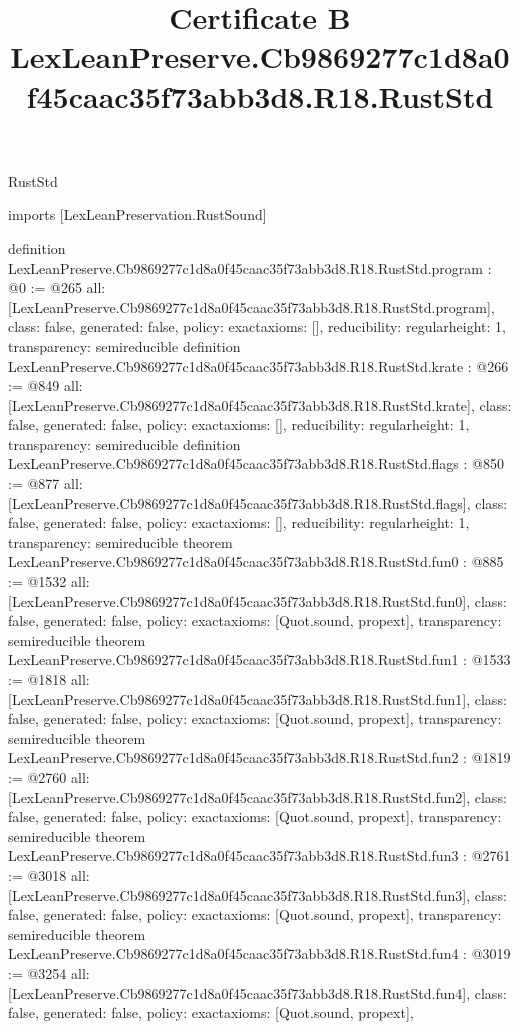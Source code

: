 \begin{lexlean}{RustStd}
\title{Certificate B LexLeanPreserve.Cb9869277c1d8a0f45caac35f73abb3d8.R18.RustStd}
\begin{coremodule}
imports [LexLeanPreservation.RustSound]

definition LexLeanPreserve.Cb9869277c1d8a0f45caac35f73abb3d8.R18.RustStd.program : @0 := @265 {
  all: [LexLeanPreserve.Cb9869277c1d8a0f45caac35f73abb3d8.R18.RustStd.program],
  class: false,
  generated: false,
  policy: exact{axioms: []},
  reducibility: regular{height: 1},
  transparency: semireducible
}
definition LexLeanPreserve.Cb9869277c1d8a0f45caac35f73abb3d8.R18.RustStd.krate : @266 := @849 {
  all: [LexLeanPreserve.Cb9869277c1d8a0f45caac35f73abb3d8.R18.RustStd.krate],
  class: false,
  generated: false,
  policy: exact{axioms: []},
  reducibility: regular{height: 1},
  transparency: semireducible
}
definition LexLeanPreserve.Cb9869277c1d8a0f45caac35f73abb3d8.R18.RustStd.flags : @850 := @877 {
  all: [LexLeanPreserve.Cb9869277c1d8a0f45caac35f73abb3d8.R18.RustStd.flags],
  class: false,
  generated: false,
  policy: exact{axioms: []},
  reducibility: regular{height: 1},
  transparency: semireducible
}
theorem LexLeanPreserve.Cb9869277c1d8a0f45caac35f73abb3d8.R18.RustStd.fun0 : @885 := @1532 {
  all: [LexLeanPreserve.Cb9869277c1d8a0f45caac35f73abb3d8.R18.RustStd.fun0],
  class: false,
  generated: false,
  policy: exact{axioms: [Quot.sound, propext]},
  transparency: semireducible
}
theorem LexLeanPreserve.Cb9869277c1d8a0f45caac35f73abb3d8.R18.RustStd.fun1 : @1533 := @1818 {
  all: [LexLeanPreserve.Cb9869277c1d8a0f45caac35f73abb3d8.R18.RustStd.fun1],
  class: false,
  generated: false,
  policy: exact{axioms: [Quot.sound, propext]},
  transparency: semireducible
}
theorem LexLeanPreserve.Cb9869277c1d8a0f45caac35f73abb3d8.R18.RustStd.fun2 : @1819 := @2760 {
  all: [LexLeanPreserve.Cb9869277c1d8a0f45caac35f73abb3d8.R18.RustStd.fun2],
  class: false,
  generated: false,
  policy: exact{axioms: [Quot.sound, propext]},
  transparency: semireducible
}
theorem LexLeanPreserve.Cb9869277c1d8a0f45caac35f73abb3d8.R18.RustStd.fun3 : @2761 := @3018 {
  all: [LexLeanPreserve.Cb9869277c1d8a0f45caac35f73abb3d8.R18.RustStd.fun3],
  class: false,
  generated: false,
  policy: exact{axioms: [Quot.sound, propext]},
  transparency: semireducible
}
theorem LexLeanPreserve.Cb9869277c1d8a0f45caac35f73abb3d8.R18.RustStd.fun4 : @3019 := @3254 {
  all: [LexLeanPreserve.Cb9869277c1d8a0f45caac35f73abb3d8.R18.RustStd.fun4],
  class: false,
  generated: false,
  policy: exact{axioms: [Quot.sound, propext]},
}
\end{coremodule}
\end{lexlean}
